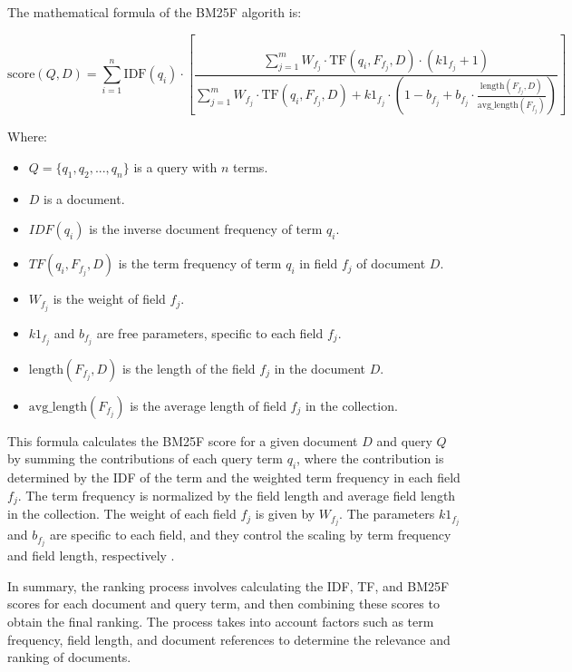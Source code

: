 \documentclass{article}
\begin{document}
The mathematical formula of the BM25F algorith is:

\begin{equation}
    \text{{score}}(Q, D) = \sum_{i=1}^{n} \text{{IDF}}(q_i) \cdot \left[ \frac{\sum_{j=1}^{m} W_{f_j} \cdot \text{{TF}}(q_i, F_{f_j}, D) \cdot (k1_{f_j} + 1)}{\sum_{j=1}^{m} W_{f_j} \cdot \text{{TF}}(q_i, F_{f_j}, D) + k1_{f_j} \cdot (1 - b_{f_j} + b_{f_j} \cdot \frac{\text{{length}}(F_{f_j}, D)}{\text{{avg\_length}}(F_{f_j})})} \right]
\end{equation}

Where:
\begin{itemize}
  \item $Q = \{q_1, q_2, ..., q_n\}$ is a query with $n$ terms.
  \item $D$ is a document.
  \item $IDF(q_i)$ is the inverse document frequency of term $q_i$.
  \item $TF(q_i, F_{f_j}, D)$ is the term frequency of term $q_i$ in field $f_j$ of document $D$.
  \item $W_{f_j}$ is the weight of field $f_j$.
  \item $k1_{f_j}$ and $b_{f_j}$ are free parameters, specific to each field $f_j$.
  \item $\text{{length}}(F_{f_j}, D)$ is the length of the field $f_j$ in the document $D$.
  \item $\text{{avg\_length}}(F_{f_j})$ is the average length of field $f_j$ in the collection.
\end{itemize}

This formula calculates the BM25F score for a given document $D$ and query $Q$ by summing 
the contributions of each query term $q_i$, where the contribution is determined by the IDF of 
the term and the weighted term frequency in each field $f_j$. The term frequency is normalized
by the field length and average field length in the collection. The weight of each field $f_j$ is
given by $W_{f_j}$. The parameters $k1_{f_j}$ and $b_{f_j}$ are specific to each field, and they control the 
scaling by term frequency and field length, respectively \cite{rostami2022investigating}. 

In summary, the ranking process involves calculating the IDF, TF, and BM25F \cite{PJAGIF10} 
scores for each 
document and query term, and then combining these scores to obtain the final ranking. The 
process takes into account factors such as term frequency, field length, and document references 
to determine the relevance and ranking of documents.
\end{document}
